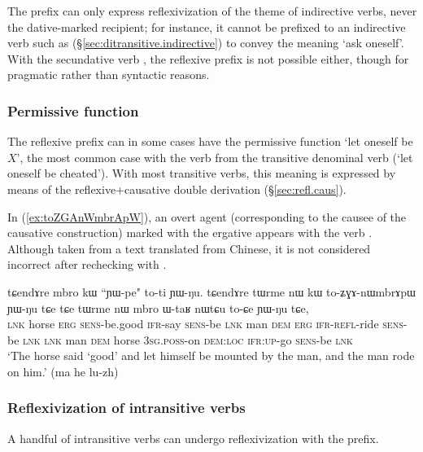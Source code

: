 The  prefix can only express reflexivization of the theme of indirective verbs, never the dative-marked recipient; for instance, it cannot be prefixed to an indirective verb such as  (§\ref{sec:ditransitive.indirective}) to convey the meaning `ask oneself'. With the secundative verb , the reflexive prefix is not possible either, though for pragmatic rather than syntactic reasons. 
   \subsubsection{Permissive function} \label{sec:refl.permissive}
The reflexive prefix can in some cases have the permissive function  `let oneself be $X$', the most common case with the verb  from the transitive denominal verb  (`let oneself be cheated'). With most transitive verbs, this meaning is expressed by means of the reflexive+causative double derivation (§\ref{sec:refl.caus}).

In (\ref{ex:toZGAnWmbrApW}), an overt agent (corresponding to the causee of the causative construction) marked with the ergative  appears with the verb . Although taken from a text translated from Chinese, it is not considered incorrect after rechecking with . 

 \begin{exe}
\ex \label{ex:toZGAnWmbrApW}
 \gll  tɕendɤre mbro kɯ ``ɲɯ-pe" to-ti ɲɯ-ŋu. tɕendɤre tɯrme nɯ kɯ to-ʑɣɤ-nɯmbrɤpɯ ɲɯ-ŋu tɕe tɕe tɯrme nɯ mbro ɯ-taʁ nɯtɕu to-ɕe ɲɯ-ŋu tɕe, \\
 \textsc{lnk} horse \textsc{erg} \textsc{sens}-be.good \textsc{ifr}-say \textsc{sens}-be \textsc{lnk}  man \textsc{dem} \textsc{erg} \textsc{ifr}-\textsc{refl}-ride \textsc{sens}-be \textsc{lnk} \textsc{lnk} man \textsc{dem} horse \textsc{3sg}.\textsc{poss}-on \textsc{dem}:\textsc{loc} \textsc{ifr}:\textsc{up}-go \textsc{sens}-be \textsc{lnk} \\
 \glt  `The horse said `good' and let himself be mounted by the man, and the man rode on him.'  (ma he lu-zh)
 \end{exe}


\subsubsection{Reflexivization of intransitive verbs} \label{sec:refl.intr}
A handful of intransitive verbs can undergo reflexivization with the  prefix.

